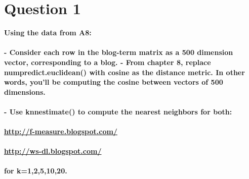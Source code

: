 \chapter{Question 1}
\label{intro}

\textbf{Using the data from A8:\\\\
- Consider each row in the blog-term matrix as a 500 dimension vector, corresponding to a blog.  
- From chapter 8, replace numpredict.euclidean() with cosine as the distance metric.  In other words, you'll be computing the cosine between vectors of 500 dimensions.  \\\\
- Use knnestimate() to compute the nearest neighbors for both:\\\\
\url{http://f-measure.blogspot.com/}\\\\
\url{http://ws-dl.blogspot.com/}\\\\
for k={1,2,5,10,20}.}\\\\

